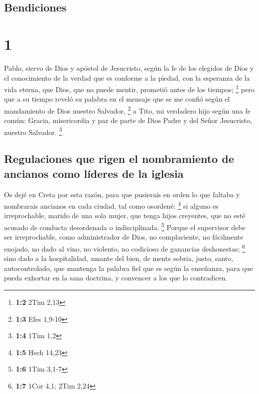\hypertarget{bendiciones}{%
\subsection{Bendiciones}\label{bendiciones}}

\hypertarget{section}{%
\section{1}\label{section}}

 Pablo, siervo de Dios y apóstol de Jesucristo, según la
fe de los elegidos de Dios y el conocimiento de la verdad que es
conforme a la piedad,  con la esperanza de la vida eterna,
que Dios, que no puede mentir, prometió antes de los tiempos;
\footnote{\textbf{1:2} 2Tim 2,13}  pero que a su tiempo
reveló su palabra en el mensaje que se me confió según el mandamiento de
Dios nuestro Salvador, \footnote{\textbf{1:3} Efes 1,9-10}
 a Tito, mi verdadero hijo según una fe común: Gracia,
misericordia y paz de parte de Dios Padre y del Señor Jesucristo,
nuestro Salvador. \footnote{\textbf{1:4} 1Tim 1,2}

\hypertarget{regulaciones-que-rigen-el-nombramiento-de-ancianos-como-luxedderes-de-la-iglesia}{%
\subsection{Regulaciones que rigen el nombramiento de ancianos como
líderes de la
iglesia}\label{regulaciones-que-rigen-el-nombramiento-de-ancianos-como-luxedderes-de-la-iglesia}}

 Os dejé en Creta por esta razón, para que pusierais en
orden lo que faltaba y nombrarais ancianos en cada ciudad, tal como
osordené: \footnote{\textbf{1:5} Hech 14,23}  si alguno es
irreprochable, marido de una sola mujer, que tenga hijos creyentes, que
no esté acusado de conducta desordenada o indisciplinada. \footnote{\textbf{1:6}
  1Tim 3,1-7}  Porque el supervisor debe ser
irreprochable, como administrador de Dios, no complaciente, no
fácilmente enojado, no dado al vino, no violento, no codicioso de
ganancias deshonestas; \footnote{\textbf{1:7} 1Cor 4,1; 2Tim 2,24}
 sino dado a la hospitalidad, amante del bien, de mente
sobria, justo, santo, autocontrolado,  que mantenga la
palabra fiel que es según la enseñanza, para que pueda exhortar en la
sana doctrina, y convencer a los que lo contradicen.


